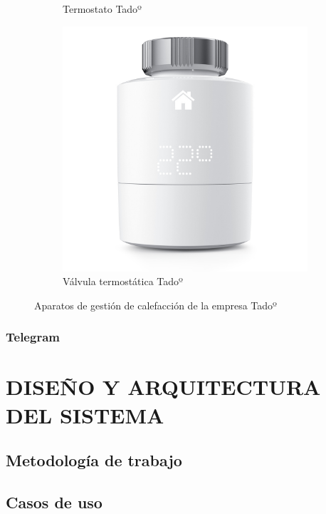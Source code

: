 \documentclass[spanish,12pt, a4paper, twoside]{paper}
\let\oldsection\section
\def\section{\cleardoublepage\oldsection}
\begin{document}
\begin{figure}[h]
\begin{subfigure}{0.5\textwidth}
\caption{Termostato Tadoº}
\label{fig:termostato tado}
\end{subfigure}
\begin{subfigure}{0.5\textwidth}
\includegraphics[width=\textwidth]{recursos/valvula.jpeg}
\caption{Válvula termostática Tadoº}
\label{fig:valvula tado}
\end{subfigure}

\caption{Aparatos de gestión de calefacción de la empresa Tadoº}
\label{fig:aparatos tado}
\end{figure}

\subsubsection{Telegram}

\section{DISEÑO Y ARQUITECTURA DEL SISTEMA}

\subsection{Metodología de trabajo}

\subsection{Casos de uso}
\end{document}
